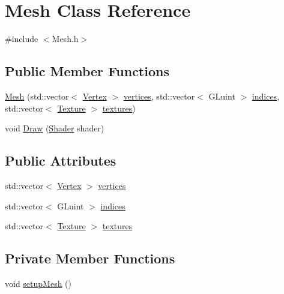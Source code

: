 \hypertarget{classMesh}{}\section{Mesh Class Reference}
\label{classMesh}


{\ttfamily \#include $<$Mesh.\+h$>$}

\subsection*{Public Member Functions}
\begin{DoxyCompactItemize}
\item 
\mbox{\hyperlink{classMesh_af1baf95f510199fd2b3631e9daae79ce}{Mesh}} (std\+::vector$<$ \mbox{\hyperlink{structVertex}{Vertex}} $>$ \mbox{\hyperlink{classMesh_a6465a888c97232a39e12aad008c969c3}{vertices}}, std\+::vector$<$ G\+Luint $>$ \mbox{\hyperlink{classMesh_a5e55b84c6c967608bcf23ed7d68e4215}{indices}}, std\+::vector$<$ \mbox{\hyperlink{structTexture}{Texture}} $>$ \mbox{\hyperlink{classMesh_abf1e672703bf4f8e104f3b076faaf958}{textures}})
\item 
void \mbox{\hyperlink{classMesh_a143c8d7c179801c6377853db26d4a19f}{Draw}} (\mbox{\hyperlink{classShader}{Shader}} shader)
\end{DoxyCompactItemize}
\subsection*{Public Attributes}
\begin{DoxyCompactItemize}
\item 
std\+::vector$<$ \mbox{\hyperlink{structVertex}{Vertex}} $>$ \mbox{\hyperlink{classMesh_a6465a888c97232a39e12aad008c969c3}{vertices}}
\item 
std\+::vector$<$ G\+Luint $>$ \mbox{\hyperlink{classMesh_a5e55b84c6c967608bcf23ed7d68e4215}{indices}}
\item 
std\+::vector$<$ \mbox{\hyperlink{structTexture}{Texture}} $>$ \mbox{\hyperlink{classMesh_abf1e672703bf4f8e104f3b076faaf958}{textures}}
\end{DoxyCompactItemize}
\subsection*{Private Member Functions}
\begin{DoxyCompactItemize}
\item 
void \mbox{\hyperlink{classMesh_aafa4e21067a9b0c4407daf5e3c9ea991}{setup\+Mesh}} ()
\end{DoxyCompactItemize}
